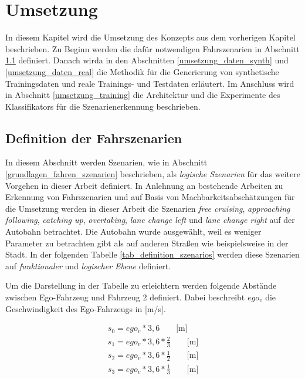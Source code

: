 
\chapter{Umsetzung}
\label{umsetzung}

In diesem Kapitel wird die Umsetzung des Konzepts aus dem vorherigen Kapitel beschrieben. Zu Beginn werden die dafür notwendigen Fahrszenarien in Abschnitt \ref{umsetzung_definition} definiert. Danach wirda in den Abschnitten \ref{umsetzung_daten_synth} und \ref{umsetzung_daten_real} die Methodik für die Generierung von synthetische Trainingsdaten und reale Trainings- und Testdaten erläutert. Im Anschluss wird in Abschnitt \ref{umsetzung_training} die Architektur und die Experimente des Klassifikators für die Szenarienerkennung beschrieben.


\section{Definition der Fahrszenarien}
\label{umsetzung_definition}

In diesem Abschnitt werden Szenarien, wie in Abschnitt \ref{grundlagen_fahren_szenarien} beschrieben, als \textit{logische Szenarien} für das weitere Vorgehen in dieser Arbeit definiert. In Anlehnung an bestehende Arbeiten zu Erkennung von Fahrszenarien und auf Basis von Machbarkeitsabschätzungen für die Umsetzung werden in dieser Arbeit die Szenarien \textit{free cruising}, \textit{approaching} \textit{following}, \textit{catching up}, \textit{overtaking}, \textit{lane change left} und \textit{lane change right} auf der Autobahn betrachtet. Die Autobahn wurde ausgewählt, weil es weniger Parameter zu betrachten gibt als auf anderen Straßen wie beispielsweise in der Stadt. In der folgenden Tabelle \ref{tab_definition_szenarios} werden diese Szenarien auf \textit{funktionaler} und \textit{logischer Ebene} definiert.

Um die Darstellung in der Tabelle zu erleichtern werden folgende Abstände zwischen Ego-Fahrzeug und Fahrzeug 2 definiert. Dabei beschreibt $ego_v$ die Geschwindigkeit des Ego-Fahrzeugs in [m/s].

\begin{equation*}
\begin{split}
s_0 = ego_v * 3,6 \qquad \text{[m]} \\
s_1 = ego_v * 3,6 * \frac{2}{3} \qquad \text{[m]} \\
s_2 = ego_v * 3,6 * \frac{1}{2} \qquad \text{[m]} \\
s_3 = ego_v * 3,6 * \frac{1}{3} \qquad \text{[m]} \\
\end{split}
\end{equation*}

